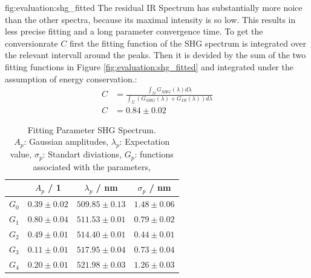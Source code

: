     {fig:evaluation:shg_fitted}
\noindent The residual IR Spectrum has substantially more noice than the other spectra, because its maximal intensity is so low.
This results in less precise fitting and a long parameter convergence time.
To get the conversionrate $C$ first the fitting function of the SHG spectrum is integrated over the relevant intervall around the peaks. 
Then it is devided by the sum of the two fitting functions in Figure \ref{fig:evaluation:shg_fitted} and integrated under the assumption of energy conservation.:
\begin{align}
    C &= \frac{\int_{\varOmega} G_{SHG}(\lambda) d \lambda}{ \int_{\Sigma} (G_{SHG}(\lambda) + G_{IR}(\lambda))d \lambda} \\
    C &= 0.84 \pm 0.02 
\end{align}

\begin{table}[H]
    \label{}
    \centering
    \caption{Fitting Parameter SHG Spectrum. \\
    $A_p$: Gaussian amplitudes,
    $\lambda_p$: Expectation value,
    $\sigma_p$: Standart diviations,
    $G_p$: functions associated with the parameters,}
    
    \begin{tabular}{c|ccc} \hline
        &  $A_p$ / 1 &  $\lambda_p$ / nm & $\sigma_p$ / nm \\ \hline \hline 
    $G_0$&$0.39 \pm 0.02$&$509.85 \pm 0.13$&$1.48 \pm 0.06$\\ \hline
    $G_1$&$0.80 \pm 0.04$&$511.53 \pm 0.01$&$0.79\pm 0.02$\\ \hline
    $G_2$&$0.49 \pm 0.01$&$514.40 \pm 0.01$&$0.44 \pm 0.01$\\ \hline
    $G_3$&$0.11 \pm 0.01$&$517.95 \pm 0.04$&$0.73 \pm 0.04$\\ \hline
    $G_4$&$0.20 \pm 0.01$&$521.98 \pm 0.03$&$1.26 \pm 0.03$\\ \hline
    \end{tabular}
    \end{table}

